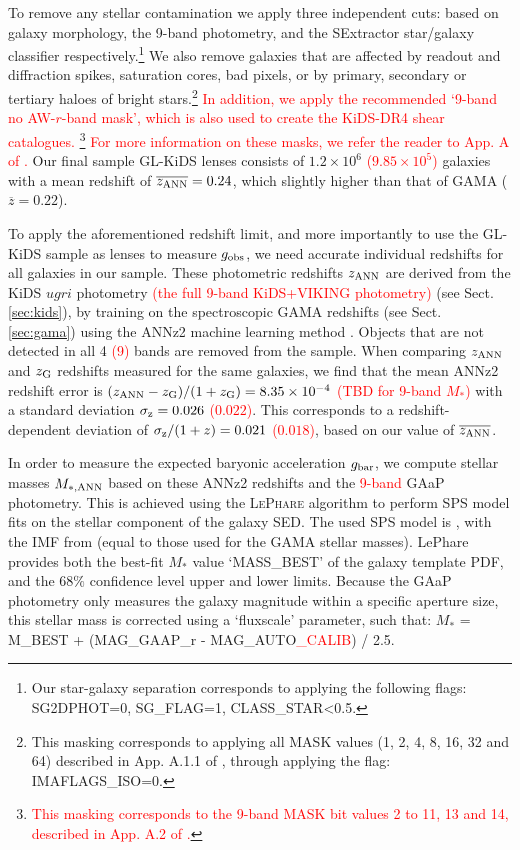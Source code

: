 \documentclass[usenatbib]{mnras}
\newcommand*{\mean}[1]{\overline{#1}}
\newcommand*{\E}[1]{\times 10^{#1}}
\newcommand{\un}[1]{_{\rm #1}}
\begin{document}
To remove any stellar contamination we apply three independent cuts: based on galaxy morphology, the 9-band photometry, and the SExtractor star/galaxy classifier respectively.\footnote{Our star-galaxy separation corresponds to applying the following flags: SG2DPHOT=0, SG\_FLAG=1, CLASS\_STAR<0.5.} We also remove galaxies that are affected by readout and diffraction spikes, saturation cores, bad pixels, or by primary, secondary or tertiary haloes of bright stars.\footnote{This masking corresponds to applying all MASK values (1, 2, 4, 8, 16, 32 and 64) described in App. A.1.1 of \cite{kuijken2019}, through applying the flag: IMAFLAGS\_ISO=0.} \textcolor{red}{In addition, we apply the recommended `9-band no AW-$r$-band mask', which is also used to create the KiDS-DR4 shear catalogues. \footnote{\textcolor{red}{This masking corresponds to the 9-band MASK bit values 2 to 11, 13 and 14, described in App. A.2 of \cite{kuijken2019}.}} For more information on these masks, we refer the reader to App. A of \cite{kuijken2019}.} Our final sample GL-KiDS lenses consists of $1.2\E6$ \textcolor{red}{($9.85\E{5}$)} galaxies with a mean redshift of $\mean{z\un{ANN}}=0.24$, which slightly higher than that of GAMA ($\mean{z}=0.22$).

To apply the aforementioned redshift limit, and more importantly to use the GL-KiDS sample as lenses to measure $g\un{obs}$, we need accurate individual redshifts for all galaxies in our sample. These photometric redshifts $z\un{ANN}$ are derived from the KiDS $ugri$ photometry \textcolor{red}{(the full 9-band KiDS+VIKING photometry)} (see Sect. \ref{sec:kids}), by training on the spectroscopic GAMA redshifts (see Sect. \ref{sec:gama}) using the ANNz2 machine learning method \cite[]{sadeh2016,dejong2017,bilicki2017}. Objects that are not detected in all 4 \textcolor{red}{(9)} bands are removed from the sample. When comparing $z\un{ANN}$ and $z\un{G}$ redshifts measured for the same galaxies, we find that the mean ANNz2 redshift error is $(z\un{ANN} - z\un{G})/(1+z\un{G}) = 8.35\E{-4}$ \textcolor{red}{(TBD for 9-band $M_*$)} with a standard deviation $\sigma\un{z} = 0.026$ \textcolor{red}{($0.022$)}. This corresponds to a redshift-dependent deviation of $\sigma\un{z}/(1+z)=0.021$ \textcolor{red}{($0.018$)}, based on our value of $\mean{z\un{ANN}}$.

In order to measure the expected baryonic acceleration $g\un{bar}$, we compute stellar masses $M\un{*,ANN}$ based on these ANNz2 redshifts and the \textcolor{red}{9-band} GAaP photometry. This is achieved using the \textsc{LePhare} algorithm \cite[]{arnouts1999, ilbert2006} to perform SPS model fits on the stellar component of the galaxy SED. The used SPS model is \cite{bruzual2003}, with the IMF from \cite{chabrier2003} (equal to those used for the GAMA stellar masses). LePhare provides both the best-fit $M_*$ value `MASS\_BEST' of the galaxy template PDF, and the $68\%$ confidence level upper and lower limits. Because the GAaP photometry only measures the galaxy magnitude within a specific aperture size, this stellar mass is corrected using a `fluxscale' parameter, such that: $M_*$ = M\_BEST + (MAG\_GAAP\_r - MAG\_AUTO\textcolor{red}{\_CALIB}) / 2.5.
\end{document}
